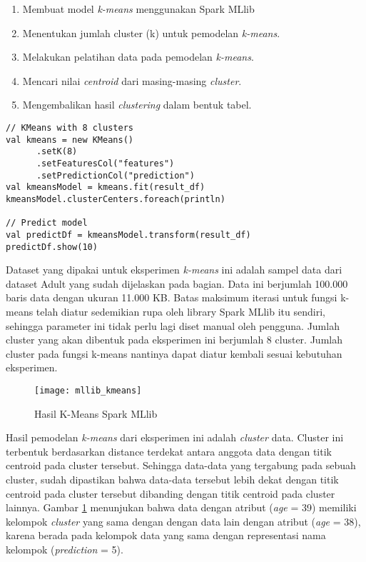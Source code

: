 \begin{enumerate}
\item Membuat model \textit{k-means} menggunakan Spark MLlib
\item Menentukan jumlah cluster (k) untuk pemodelan \textit{k-means}.
\item Melakukan pelatihan data pada pemodelan \textit{k-means}.
\item Mencari nilai \textit{centroid} dari masing-masing \textit{cluster}.
\item Mengembalikan hasil \textit{clustering} dalam bentuk tabel.
\end{enumerate}	

\begin{lstlisting}[basicstyle=\ttfamily, frame=single,
	columns=fullflexible, keepspaces=true, breaklines=true, label=lst:kmeans_mllib, caption=Eksperimen K-Means Spark MLlib]
// KMeans with 8 clusters
val kmeans = new KMeans()
      .setK(8)
      .setFeaturesCol("features")
      .setPredictionCol("prediction")
val kmeansModel = kmeans.fit(result_df)
kmeansModel.clusterCenters.foreach(println)

// Predict model
val predictDf = kmeansModel.transform(result_df)
predictDf.show(10)

\end{lstlisting}

\noindent Dataset yang dipakai untuk eksperimen \textit{k-means} ini adalah sampel data dari dataset Adult yang sudah dijelaskan pada bagian. Data ini berjumlah 100.000 baris data dengan ukuran 11.000 KB. Batas maksimum iterasi untuk fungsi k-means telah diatur sedemikian rupa oleh library Spark MLlib itu sendiri, sehingga parameter ini tidak perlu lagi diset manual oleh pengguna. Jumlah cluster yang akan dibentuk pada eksperimen ini berjumlah 8 cluster. Jumlah cluster pada fungsi k-means nantinya dapat diatur kembali sesuai kebutuhan eksperimen.

\begin{figure}[H]
	\centering
	\texttt{[image: mllib\_kmeans]}
	\caption{Hasil K-Means Spark MLlib}
	\label{fig:mllib_kmeans}
\end{figure}

\noindent Hasil pemodelan \textit{k-means} dari eksperimen ini adalah \textit{cluster} data. Cluster ini terbentuk berdasarkan distance terdekat antara anggota data dengan titik centroid pada cluster tersebut. Sehingga data-data yang tergabung pada sebuah cluster, sudah dipastikan bahwa data-data tersebut lebih dekat dengan titik centroid pada cluster tersebut dibanding dengan titik centroid pada cluster lainnya. Gambar \ref{fig:mllib_kmeans} menunjukan bahwa data dengan atribut (\textit{age} = 39) memiliki kelompok \textit{cluster} yang sama dengan dengan data lain dengan atribut (\textit{age} = 38), karena berada pada kelompok data yang sama dengan representasi nama kelompok (\textit{prediction} = 5).

